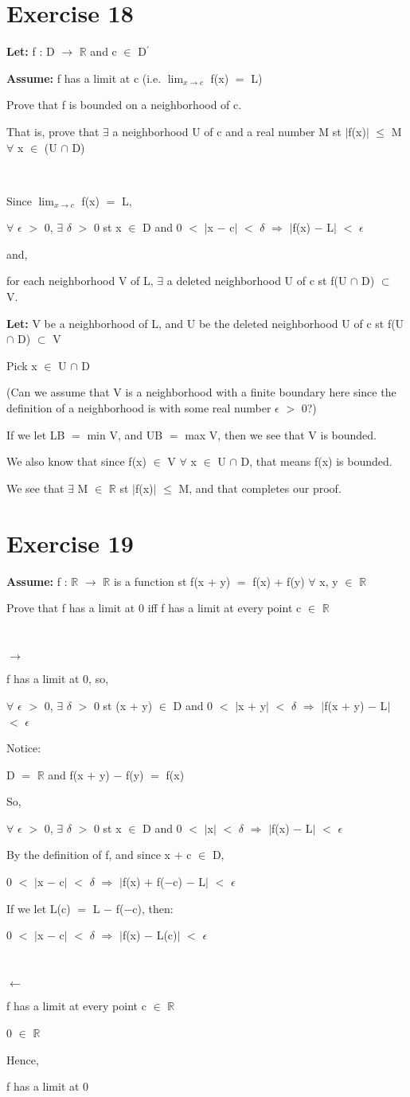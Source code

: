 \documentclass{article}
\newcommand{\mt}[1]{\ensuremath{#1}}
\newcommand\bsc[2][\DefaultOpt]{%
  \def\DefaultOpt{#2}%
  \section[#1]{#2}%
}
\newcommand{\lt}[1]{\textbf{Let: } #1}
\newcommand{\as}[1]{\textbf{Assume: } #1}
\newcommand{\br}{\mt{\mathbb{R}} }       %
\newcommand{\ep}{\mt{\epsilon} }         %
\newcommand{\fa}{\mt{\forall} }          %
\newcommand{\dta}{\mt{\delta} }
\newcommand{\mem}{\mt{\in} }
\newcommand{\exs}{\mt{\exists} }
\newcommand{\sbs}{\mt{\subset} }         %
\newcommand{\lra}{ \mt{\longrightarrow} } %
\newcommand{\rar}{ \mt{\Rightarrow} }     %
\newcommand{\lla}{ \mt{\longleftarrow} }  %
\newcommand{\av}[1]{\mt{|}#1\mt{|}}  %
\newcommand{\ps}{\mt{+} }
\newcommand{\ms}{\mt{-} }
\newcommand{\ls}{\mt{<} }
\newcommand{\gr}{\mt{>} }
\newcommand{\lse}{\mt{\leq} }
\newcommand{\eql}{\mt{=} }
\newcommand{\pr}{\mt{^\prime} } 		   %
\newcommand{\limt}[2]{\mt{\displaystyle{\lim_{#1 \to #2}}}}
\newcommand{\inn}{\mt{\cap} }
\begin{document}
\newpage

\bsc{Exercise 18}{

\lt{f : D \lra \br and c \mem D\pr}

\as{f has a limit at c (i.e. \limt{x}{c} f(x) \eql L)}

Prove that f is bounded on a neighborhood of c.

That is, prove that \exs a neighborhood U of c and a real number M st \av{f(x)} \lse M \fa x \mem (U \inn D)

\

Since \limt{x}{c} f(x) \eql L,

\fa \ep \gr 0, \exs \dta \gr 0 st x \mem D and 0 \ls \av{x \ms c} \ls \dta \rar \av{f(x) \ms L} \ls \ep

and,

for each neighborhood V of L, \exs a deleted neighborhood U of c st f(U $\cap$ D) \sbs V.

\lt{V be a neighborhood of L, and U be the deleted neighborhood U of c st f(U \inn D) \sbs V}

Pick x \mem U \inn D

(Can we assume that V is a neighborhood with a finite boundary here since the definition of a neighborhood is with some real number \ep \gr 0?)

If we let LB \eql min V, and UB \eql max V, then we see that V is bounded.

We also know that since f(x) \mem V \fa x \mem U \inn D, that means f(x) is bounded.

We see that \exs M \mem \br st \av{f(x)} \lse M, and that completes our proof.

}

\bsc{Exercise 19}{

\as{f : \br \lra \br is a function st f(x \ps y) \eql f(x) \ps f(y) \fa x, y \mem \br}

Prove that f has a limit at 0 iff f has a limit at every point c \mem \br

\

\lra

f has a limit at 0, so,

\fa \ep \gr 0, \exs \dta \gr 0 st (x \ps y) \mem D and 0 \ls \av{x \ps y} \ls \dta \rar \av{f(x \ps y) \ms L} \ls \ep

Notice:

D \eql \br and f(x \ps y) \ms f(y) \eql f(x)

So,

\fa \ep \gr 0, \exs \dta \gr 0 st x \mem D and 0 \ls \av{x} \ls \dta \rar \av{f(x) \ms L} \ls \ep

By the definition of f, and since x \ps c \mem D,

0 \ls \av{x \ms c} \ls \dta \rar \av{f(x) \ps f($-$c) \ms L} \ls \ep

If we let L(c) \eql L \ms f($-$c), then:

0 \ls \av{x \ms c} \ls \dta \rar \av{f(x) \ms L(c)} \ls \ep

\

\lla

f has a limit at every point c \mem \br

0 \mem \br

Hence,

f has a limit at 0

}
\end{document}
